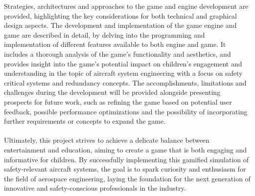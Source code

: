 Strategies, architectures and approaches to the game and engine development are provided, highlighting the key considerations for both
technical and graphical design aspects.
The development and implementation of the game engine and game are described in detail, by delving into the programming and implementation of
different features available to both engine and game.
It includes a thorough analysis of the game's functionality and aesthetics, and provides insight into the game's potential impact on children's
engagement and understanding in the topic of aircraft system engineering with a focus on safety critical systems and redundancy concepts.
The accomplishments, limitations and challenges during the development will be provided alongside presenting prospects for future work, such
as refining the game based on potential user feedback, possible performance optimizations and the possibility of incorporating further requirements or
concepts to expand the game.
\\
\\
Ultimately, this project strives to achieve a delicate balance between entertainment and education,
aiming to create a game that is both engaging and informative for children.
By successfully implementing this gamified simulation of safety-relevant aircraft systems,
the goal is to spark curiosity and enthusiasm for the field of aerospace engineering,
laying the foundation for the next generation of innovative and safety-conscious professionals in the industry.